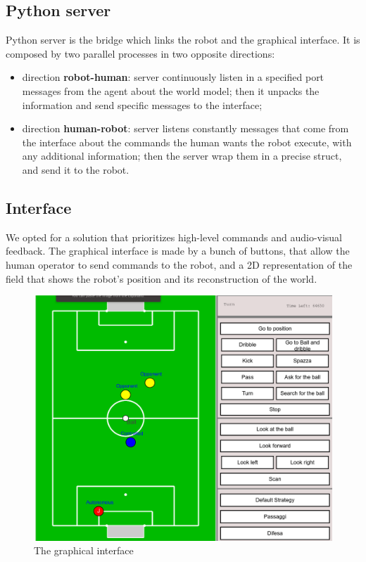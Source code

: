 \documentclass[a4paper, onecolumn, 12pt]{article}
\begin{document}
\subsection{Python server}

Python server is the bridge which links the robot and the graphical 
interface. It is composed by two parallel processes in two opposite directions:
\begin{itemize}
    \item direction \textbf{robot-human}: server continuously listen in a specified port
    messages from the agent about the world model; then it unpacks the information and send 
    specific messages to the interface;
    \item direction \textbf{human-robot}: server listens constantly messages that come from
    the interface about the commands the human wants the robot execute, with any additional 
    information; then the server wrap them in a precise struct, and send it to the robot. 
     
\end{itemize} 

\subsection{Interface}
\label{subsec:interface}
We opted for a solution that prioritizes high-level commands and audio-visual
feedback. The graphical interface is made by a bunch of buttons, that allow the
human operator to send commands to the robot, and a 2D representation of the
field that shows the robot's position and its reconstruction of the world.  

\begin{figure}[H]
    \centering
    \includegraphics[width=0.9\linewidth]{assets/interface.png}
    \caption{The graphical interface}
    \label{fig:interface}
\end{figure}
\end{document}
